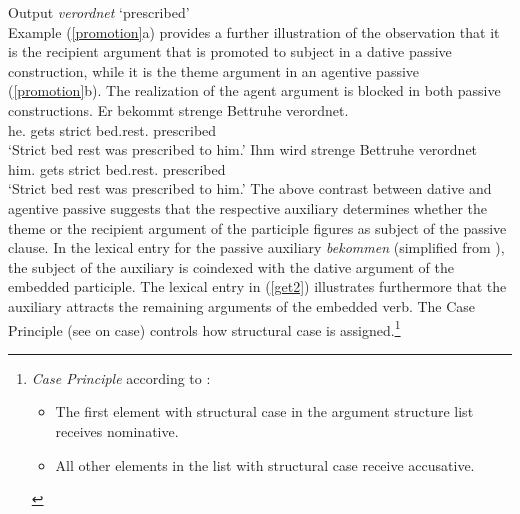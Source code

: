 \documentclass[output=paper
	        ,collection
	        ,collectionchapter
 	        ,biblatex
                ,babelshorthands
                ,newtxmath
                ,draftmode
                ,colorlinks, citecolor=brown
]{./langsci/langscibook}
\begin{document}
\ea \label{verordnet-passive}
Output \textit{verordnet} `prescribed' \\
\z 
Example (\ref{promotion}a) provides a further illustration of the observation that it is the recipient argument that is promoted to subject in a dative passive construction, while it is the theme argument in an agentive passive (\ref{promotion}b). The realization of the agent argument is blocked in both passive constructions. 
\eal \label{promotion}
\ex
\gll Er bekommt strenge Bettruhe verordnet. \\ he.\nom {} gets strict bed.rest.\acc {} prescribed \\
\glt `Strict bed rest was prescribed to him.'
\ex
\gll Ihm wird strenge Bettruhe verordnet \\ him.\dat {} gets strict bed.rest.\nom {} prescribed \\
\glt  `Strict bed rest was prescribed to him.'
\zl
The above contrast between dative and agentive passive suggests that the respective auxiliary
determines whether the theme or the recipient argument of the participle figures as subject of the
passive clause. In the lexical entry for the passive auxiliary \textit{bekommen} (simplified from
\cite[313]{mueller2013}), the subject of the auxiliary is coindexed with the dative argument of the
embedded participle. The lexical entry in (\ref{get2}) illustrates furthermore that the auxiliary
attracts the remaining arguments of the embedded verb. The Case Principle (see 
on case) controls how structural case is assigned.\footnote{\emph{Case Principle} according to \cite[287]{mueller2018}:
\begin{itemize}
\setlength{\itemsep}{0pt}
\item The first element with structural case in the argument structure list receives nominative.
\item All other elements in the list with structural case receive accusative.
\end{itemize}}
\end{document}

